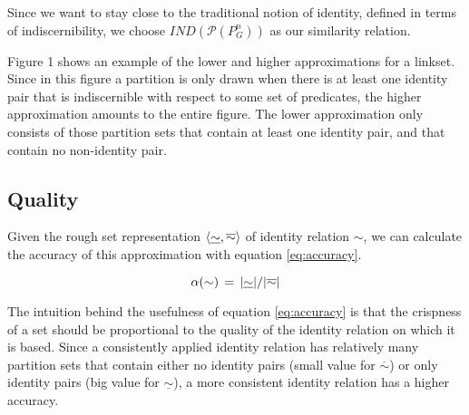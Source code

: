 \begin{comment}
\small
\begin{definition}[Higher \& lower approximation]
\label{def:higher_lower_approximation}
\begin{align}
  y \in [x]_H
\,\iff\,\\
  \exists u (
      \card{[u]_{\sim}}>1
    \,\land\,
      \mathbb{P}([u]_{\sim})=\mathbb{P}(\set{x,y})
  )\nonumber
\\
  y \in [x]_L
\,\iff\,
  \forall S \subseteq D (\\
      (\card{S}>1 \,\land\, \mathbb{P}(S) = \mathbb{P}(\set{x,y}))
    \,\rightarrow\,
      \exists s \in D (S=[s]_{\sim})
  )\nonumber
\end{align}
\end{definition}
\normalsize
\end{comment}

\noindent Since we want to stay close to the traditional notion of identity,
  defined in terms of indiscernibility,
  we choose $\mathit{IND}(\mathcal{P}(P_G^n))$ as our similarity relation.

Figure 1 shows an example of the lower and higher
  approximations for a linkset.
Since in this figure a partition is only drawn when there is at least one
  identity pair that is indiscernible with respect to some set of
  predicates, the higher approximation amounts to the entire figure.
The lower approximation only consists of those partition sets that contain
  at least one identity pair, and that contain no non-identity pair.

\subsection{Quality}
\label{sec:quality}

Given the rough set representation $\langle\underline{\sim},\overline{\sim}\rangle$
  of identity relation $\sim$, we can calculate the accuracy of this
  approximation with equation \ref{eq:accuracy}.

\small
\begin{equation}
\label{eq:accuracy}
  \alpha(\sim)
\,=\,
  \lvert\underline{\sim}\rvert / {\lvert\overline{\sim}\rvert}
\end{equation}
\normalsize

The intuition behind the usefulness of equation \ref{eq:accuracy}
  is that the crispness of a set should be proportional to the quality
  of the identity relation on which it is based.
Since a consistently applied identity relation has relatively many
  partition sets that contain either
  no identity pairs (small value for $\overline{\sim}$) or
  only identity pairs (big value for $\underline{\sim}$),
  a more consistent identity relation has a higher accuracy.


